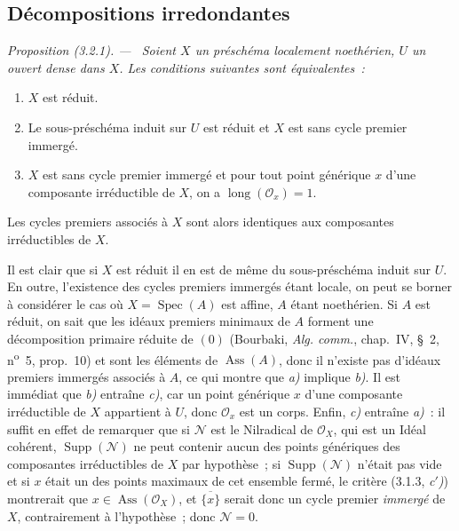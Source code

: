 \documentclass[10pt,oneside]{book}
\newcommand{\oldpage}[2][]{%
  \setcounter{footnote}{0}%
  \marginpar{\scriptsize\textbf{#1}~|~#2}\ignorespaces}
\newenvironment{proposition}[1][]{%
  \par\medskip\noindent\itshape Proposition (#1). ---\ }{\par}
\begin{document}
\oldpage[IV-2]{40}
\subsection{Décompositions irredondantes}

\begin{proposition}[3.2.1]
\label{IV.2.3.2.1-fr}
Soient $X$ un préschéma localement noethérien, $U$ un ouvert dense dans $X$.
Les conditions suivantes sont équivalentes~:
\begin{enumerate}
\item[\emph{a)}] $X$ est réduit.
\item[\emph{b)}] Le sous-préschéma induit sur $U$ est réduit et $X$ est sans
cycle premier immergé.
\item[\emph{c)}] $X$ est sans cycle premier immergé et pour tout point
générique $x$ d'une composante irréductible de $X$, on a
$\operatorname{long}(\mathcal O_x)=1$.
\end{enumerate}
Les cycles premiers associés à $X$ sont alors identiques aux composantes
irréductibles de $X$.
\end{proposition}

Il est clair que si $X$ est réduit il en est de même du sous-préschéma induit
sur $U$. En outre, l'existence des cycles premiers immergés étant locale, on
peut se borner à considérer le cas où $X=\operatorname{Spec}(A)$ est affine,
$A$ étant noethérien. Si $A$ est réduit, on sait que les idéaux premiers
minimaux de $A$ forment une décomposition primaire réduite de $(0)$
(Bourbaki, \emph{Alg. comm.}, chap.~IV, \S~2, n\textsuperscript{o}~5,
prop.~10) et sont les éléments de $\operatorname{Ass}(A)$, donc il n'existe
pas d'idéaux premiers immergés associés à $A$, ce qui montre que \emph{a)}
implique \emph{b)}. Il est immédiat que \emph{b)} entraîne \emph{c)}, car un
point générique $x$ d'une composante irréductible de $X$ appartient à $U$,
donc $\mathcal O_x$ est un corps. Enfin, \emph{c)} entraîne \emph{a)}~: il
suffit en effet de remarquer que si $\mathcal N$ est le Nilradical de
$\mathcal O_X$, qui est un Idéal cohérent, $\operatorname{Supp}(\mathcal N)$
ne peut contenir aucun des points génériques des composantes irréductibles de
$X$ par hypothèse~; si $\operatorname{Supp}(\mathcal N)$ n'était pas vide et
si $x$ était un des points maximaux de cet ensemble fermé, le critère
(3.1.3, \emph{c$'$)}) montrerait que $x\in\operatorname{Ass}(\mathcal O_X)$,
et $\overline{\{x\}}$ serait donc un cycle premier \emph{immergé} de $X$,
contrairement à l'hypothèse~; donc $\mathcal N=0$.
\end{document}
